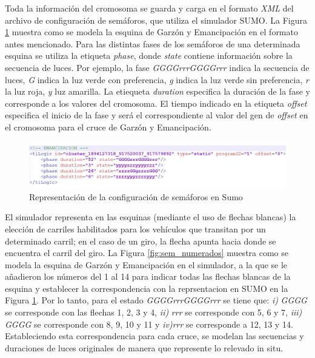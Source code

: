 Toda la información del cromosoma se guarda y carga en el formato \emph{XML} del archivo de configuración de semáforos, que utiliza el simulador SUMO. La Figura \ref{fig:rep_sumo} muestra como se modela la esquina de Garzón y Emancipación en el formato antes mencionado. Para las distintas fases de los semáforos de una determinada esquina se utiliza la etiqueta \emph{phase}, donde \emph{state} contiene información sobre la secuencia de luces. Por ejemplo, la fase \emph{GGGGrrrGGGGrrr} indica la secuencia de luces, \emph{G} indica la luz verde con preferencia, \emph{g} indica la luz verde sin preferencia, \emph{r} la luz roja, \emph{y} luz amarilla. La etiequeta \emph{duration} especifica la duración de la fase y corresponde a los valores del cromosoma. El tiempo indicado en la etiqueta \emph{offset} especifica el inicio de la fase y será el correspondiente al valor del gen de \emph{offset} en el cromosoma para el cruce de Garzón y Emancipación.


\begin{figure}[ht]
	\centering
	\includegraphics[width=\linewidth]{Figures/rep_sumo}
	\caption{Representación de la configuración de semáforos en Sumo}
	\label{fig:rep_sumo}
\end{figure}

\newpage

El simulador representa en las esquinas (mediante el uso de flechas blancas) la elección de carriles habilitados para los vehículos que transitan por un determinado carril; en el caso de un giro, la flecha apunta hacia donde se encuentra el carril del giro. La Figura \ref{fig:sem_numerados} muestra como se modela la esquina de Garzón y Emancipación en el simulador, a la que se le añadieron los números del 1 al 14 para indicar todas las flechas blancas de la esquina y establecer la correspondencia con la reprsentacion en SUMO en la Figura \ref{fig:rep_sumo}. Por lo tanto, para el estado \emph{GGGGrrrGGGGrrr} se tiene que: \textit{i)} \emph{GGGG} se corresponde con las flechas 1, 2, 3 y 4, \textit{ii)} \emph{rrr} se corresponde con 5, 6 y 7, \textit{iii)} \emph{GGGG} se corresponde con 8, 9, 10 y 11 y \textit{iv)}\emph{rrr} se corresponde a 12, 13 y 14. Estableciendo esta correspondencia para cada cruce, se modelan las secuencias y duraciones de luces originales de manera que represente lo relevado in situ.

